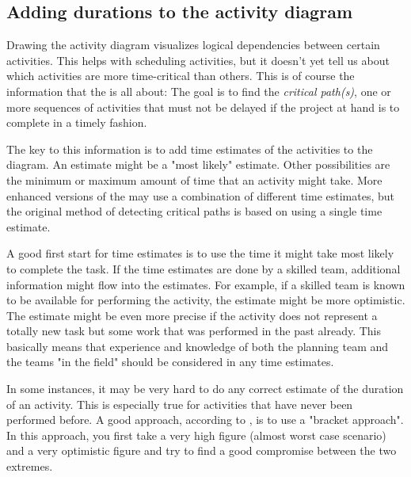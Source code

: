 \subsection{Adding durations to the activity diagram}
Drawing the activity diagram visualizes logical dependencies between certain activities. This helps
with scheduling activities, but it doesn't yet tell us about which activities are more time-critical
than others. This is of course the information that the \cpm{} is all about: The goal is to find the
\emph{critical path(s)}, one or more sequences of activities that must not be delayed if the project
at hand is to complete in a timely fashion.

The key to this information is to add time estimates of the activities to the diagram. An estimate
might be a "most likely" estimate. Other possibilities are the minimum or maximum amount of time
that an activity might take. More enhanced versions of the \cpm{} may use a combination of different
time estimates, but the original method of detecting critical paths is based on using a single time
estimate. 

A good first start for time estimates is to use the time it might take most likely to complete the
task. If the time estimates are done by a skilled team, additional information might flow into the
estimates. For example, if a skilled team is known to be available for performing the activity, the
estimate might be more optimistic. The estimate might be even more precise if the activity does not
represent a totally new task but some work that was performed in the past already. This basically
means that experience and knowledge of both the planning team and the teams "in the field" should be
considered in any time estimates.

In some instances, it may be very hard to do any correct estimate of the duration of an activity.
This is especially true for activities that have never been performed before. A good approach,
according to \cite[p. 91]{obrien}, is to use a "bracket approach". In this approach, you first take
a very high figure (almost worst case scenario) and a very optimistic figure and try to find a good
compromise between the two extremes.

